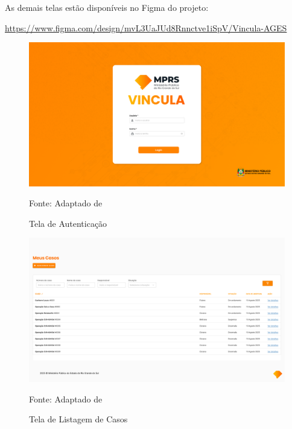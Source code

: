   As demais telas estão disponíveis no Figma do projeto:
  
  \url{https://www.figma.com/design/mvL3UaJUd8Rnnctve1iSpV/Vincula-AGES}

  \begin{figure}[H]
    \centering
    \small
    \includegraphics[width=1\linewidth]{conteudo//2 - ages I//conteudo//figures//tela-login.png}
    \caption{Tela de Autenticação}
    Fonte: Adaptado de \textcites{figma-vincula}
    \label{fig:tela-login}
  \end{figure}

  \begin{figure}[H]
    \centering
    \small
    \includegraphics[width=1\linewidth]{conteudo//2 - ages I//conteudo//figures//tela-home.png}
    \caption{Tela de Listagem de Casos}
    Fonte: Adaptado de \textcites{figma-vincula}
    \label{fig:tela-home}
  \end{figure}

